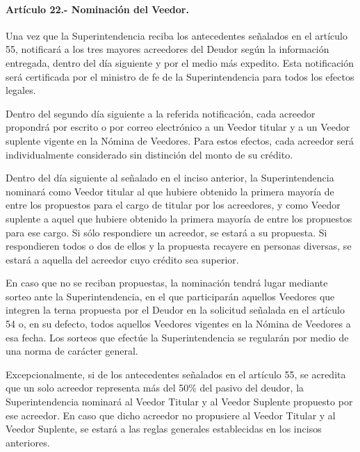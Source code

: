 \documentclass[
]{book}
\begin{document}
\hypertarget{artuxedculo-22.--nominaciuxf3n-del-veedor.}{%
\paragraph*{Artículo 22.- Nominación del Veedor.}\label{artuxedculo-22.--nominaciuxf3n-del-veedor.}}

Una vez que la Superintendencia reciba los antecedentes señalados en el artículo 55, notificará a los tres mayores acreedores del Deudor según la información entregada, dentro del día siguiente y por el medio más expedito. Esta notificación será certificada por el ministro de fe de la Superintendencia para todos los efectos legales.

Dentro del segundo día siguiente a la referida notificación, cada acreedor propondrá por escrito o por correo electrónico a un Veedor titular y a un Veedor suplente vigente en la Nómina de Veedores. Para estos efectos, cada acreedor será individualmente considerado sin distinción del monto de su crédito.

Dentro del día siguiente al señalado en el inciso anterior, la Superintendencia nominará como Veedor titular al que hubiere obtenido la primera mayoría de entre los propuestos para el cargo de titular por los acreedores, y como Veedor suplente a aquel que hubiere obtenido la primera mayoría de entre los propuestos para ese cargo. Si sólo respondiere un acreedor, se estará a su propuesta. Si respondieren todos o dos de ellos y la propuesta recayere en personas diversas, se estará a aquella del acreedor cuyo crédito sea superior.

En caso que no se reciban propuestas, la nominación tendrá lugar mediante sorteo ante la Superintendencia, en el que participarán aquellos Veedores que integren la terna propuesta por el Deudor en la solicitud señalada en el artículo 54 o, en su defecto, todos aquellos Veedores vigentes en la Nómina de Veedores a esa fecha. Los sorteos que efectúe la Superintendencia se regularán por medio de una norma de carácter general.

Excepcionalmente, si de los antecedentes señalados en el artículo 55, se acredita que un solo acreedor representa más del 50\% del pasivo del deudor, la Superintendencia nominará al Veedor Titular y al Veedor Suplente propuesto por ese acreedor. En caso que dicho acreedor no propusiere al Veedor Titular y al Veedor Suplente, se estará a las reglas generales establecidas en los incisos anteriores.
\end{document}
